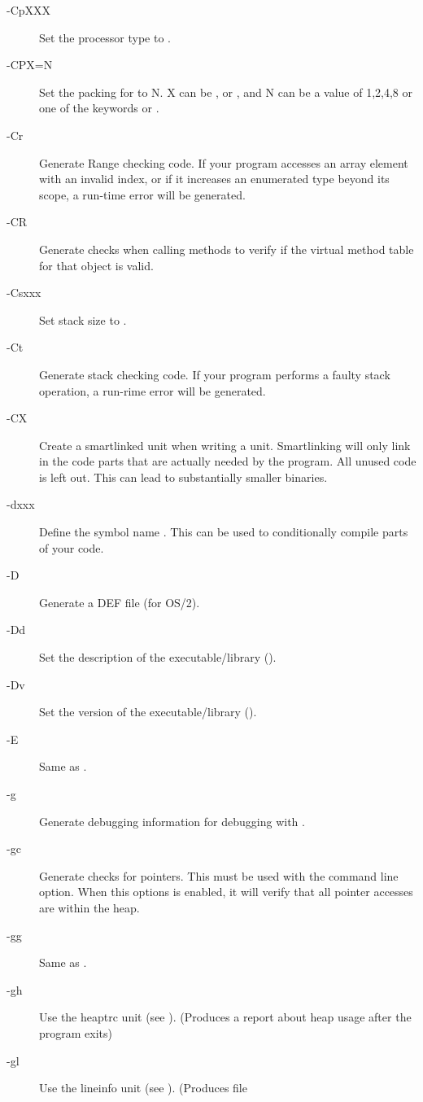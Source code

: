 \begin{description}
\item [-CpXXX] Set the processor type to .
\item [-CPX=N] Set the packing for  to N. X can be ,
 or , and N can be a value of 1,2,4,8 or one
of the keywords  or .
\item [-Cr]  Generate Range checking code. If your program
accesses an array element with an invalid index, or if it increases an
enumerated type beyond its scope, a run-time error will be generated.
\item [-CR]  Generate checks when calling methods to verify
if the virtual method table for that object is valid.
\item [-Csxxx]  Set stack size to .
\item [-Ct]  Generate stack checking code. If your program
performs a faulty stack operation, a run-rime error will be generated.
\item [-CX]  Create a smartlinked unit when writing a unit.
Smartlinking will only link in the code parts that are actually needed by
the program. All unused code is left out. This can lead to substantially
smaller binaries.
\item [-dxxx]  Define the symbol name . This can be used
to conditionally compile parts of your code.
\item [-D] Generate a DEF file (for OS/2).
\item [-Dd] Set the description of the executable/library (\windows).
\item [-Dv] Set the version of the executable/library (\windows).
\item [-E]  Same as .
\item [-g]  Generate debugging information for debugging with
.
\item [-gc] Generate checks for pointers. This must be used with the
 command line option. When this options is enabled, it will verify 
that all pointer accesses are within the heap.
\item [-gg] Same as .
\item [-gh] Use the heaptrc unit (see \unitsref). (Produces a report
about heap usage after the program exits)
\item [-gl] Use the lineinfo unit (see \unitsref). (Produces file

\end{description}

